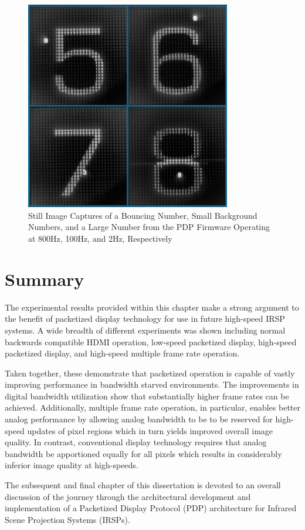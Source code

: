         \begin{figure}[t]
            \centering
            \includegraphics[width=0.80\textwidth]{fig/pdp_multi_frame_rate.jpg}
            \caption{Still Image Captures of a Bouncing Number, Small Background Numbers, and a Large Number from the PDP Firmware Operating at 800Hz, 100Hz, and 2Hz, Respectively}
            \label{fig:pdp_multi_frame_rate}
        \end{figure}

\section{Summary}
    The experimental results provided within this chapter make a strong argument to the benefit of packetized display technology for use in future high-speed IRSP systems. A wide breadth of different experiments was shown including normal backwards compatible HDMI operation, low-speed packetized display, high-speed packetized display, and high-speed multiple frame rate operation.

    Taken together, these demonstrate that packetized operation is capable of vastly improving performance in bandwidth starved environments. The improvements in digital bandwidth utilization show that substantially higher frame rates can be achieved. Additionally, multiple frame rate operation, in particular, enables better analog performance by allowing analog bandwidth to be to be reserved for high-speed updates of pixel regions which in turn yields improved overall image quality. In contrast, conventional display technology requires that analog bandwidth be apportioned equally for all pixels which results in considerably inferior image quality at high-speeds.

    The subsequent and final chapter of this dissertation is devoted to an overall discussion of the journey through the architectural development and implementation of a Packetized Display Protocol (PDP) architecture for Infrared Scene Projection Systems (IRSPs).
